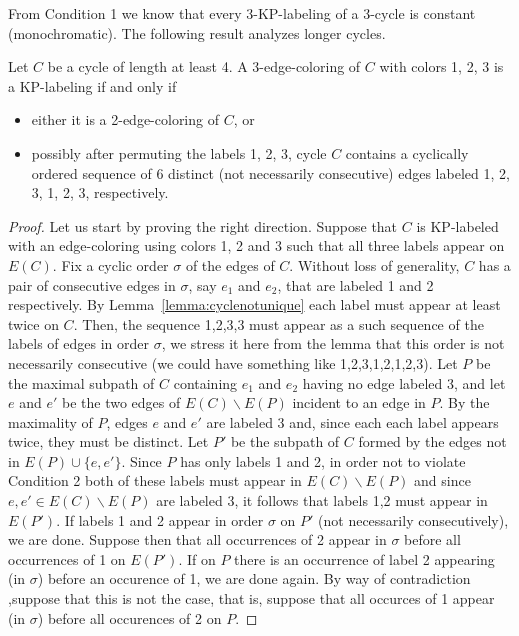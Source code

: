 \documentclass[12pt,a4paper,titlepage,openany]{report}
\begin{document}
From Condition 1 we know that every 3-KP-labeling of a 3-cycle is constant (monochromatic). The following result analyzes longer cycles.
\begin{lemma}\label{123123}
Let $C$ be a cycle of length at least 4. A 3-edge-coloring of $C$ with colors 1, 2, 3 is a KP-labeling if and only if
\begin{itemize}
\item either it is a 2-edge-coloring of $C$, or
\item possibly after permuting the labels 1, 2, 3, cycle $C$ contains a cyclically ordered sequence
of 6 distinct (not necessarily consecutive) edges labeled 1, 2, 3, 1, 2, 3, respectively. 
\end{itemize}
\end{lemma}

\begin{proof}
Let us start by proving the right direction. Suppose that $C$ is KP-labeled with an edge-coloring using colors 1, 2 and 3 such that all three labels appear on $E(C)$. Fix a cyclic order $\sigma$ of the edges of $C$. Without loss of generality, $C$ has a pair of consecutive edges in $\sigma$, say $e_1$ and $e_2$, that are labeled 1 and 2 respectively. By Lemma~\ref{lemma:cyclenotunique} each label must appear at least twice on $C$. Then, the sequence 1,2,3,3 must appear as a such sequence of the labels of edges in order $\sigma$, we stress it here from the lemma that this order is not necessarily consecutive (we could have something like 1,2,3,1,2,1,2,3). Let $P$ be the maximal subpath of $C$ containing $e_1$ and $e_2$ having no edge labeled 3, and let $e$ and $e'$ be the two edges of $E(C)\backslash E(P)$ incident to an edge in $P$. By the maximality of $P$, edges $e$ and $e'$ are labeled 3 and, since each each label appears twice, they must be distinct. Let $P'$ be the subpath of $C$ formed by the edges not in $E(P)\cup \{ e,e'\}$. Since $P$ has only labels 1 and 2, in order not to violate Condition 2 both of these labels must appear in $E(C)\backslash E(P)$ and since $e,e' \in E(C)\backslash E(P)$ are labeled 3, it follows that labels 1,2 must appear in $E(P')$. If labels 1 and 2 appear in order $\sigma$ on $P'$ (not necessarily consecutively), we are done. Suppose then that all occurrences of 2 appear in $\sigma$ before all occurrences of 1 on $E(P')$. If on $P$ there is an occurrence of label 2 appearing (in $\sigma$) before an occurence of 1, we are done again. By way of contradiction  ,suppose that this is not the case, that is, suppose that all occurces of 1 appear (in $\sigma$) before all occurences of 2 on $P$. \newline

\end{proof}
\end{document}
